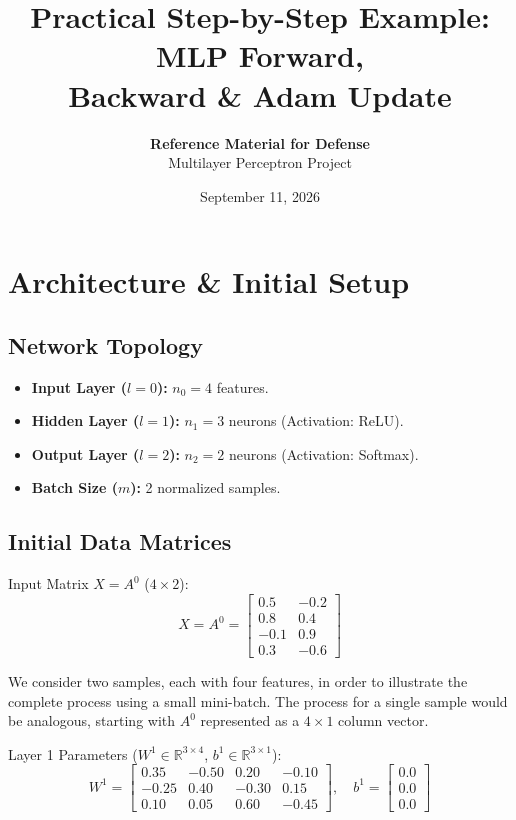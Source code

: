 \documentclass[11pt]{article}
\title{\textbf{Practical Step-by-Step Example: MLP Forward,\\ Backward \& Adam Update}}
\author{\textbf{Reference Material for Defense}\\ Multilayer Perceptron Project}
\date{September 11, 2026}
\begin{document}
\maketitle
\tableofcontents
\newpage

\section{Architecture \& Initial Setup}

\subsection*{Network Topology}
\begin{itemize}
    \item \textbf{Input Layer ($l=0$):} $n_0 = 4$ features.
    \item \textbf{Hidden Layer ($l=1$):} $n_1 = 3$ neurons (Activation: ReLU).
    \item \textbf{Output Layer ($l=2$):} $n_2 = 2$ neurons (Activation: Softmax).
    \item \textbf{Batch Size ($m$):} 2 normalized samples.
\end{itemize}

\subsection*{Initial Data Matrices}

Input Matrix $X = A^0$ ($4 \times 2$):
\[
X = A^0 =
\begin{bmatrix}
0.5 & -0.2 \\
0.8 & 0.4 \\
-0.1 & 0.9 \\
0.3 & -0.6
\end{bmatrix}
\]

We consider two samples, each with four features, in order to illustrate the complete process using a small mini-batch. The process for a single sample would be analogous, starting with $A^0$ represented as a $4 \times 1$ column vector.

Layer 1 Parameters ($W^1 \in \mathbb{R}^{3\times4}$, $b^1 \in \mathbb{R}^{3\times1}$):
\[
W^1 =
\begin{bmatrix}
0.35 & -0.50 & 0.20 & -0.10 \\
-0.25 & 0.40 & -0.30 & 0.15 \\
0.10 & 0.05 & 0.60 & -0.45
\end{bmatrix}, \quad
b^1 =
\begin{bmatrix} 0.0 \\ 0.0 \\ 0.0 \end{bmatrix}
\]
\end{document}
